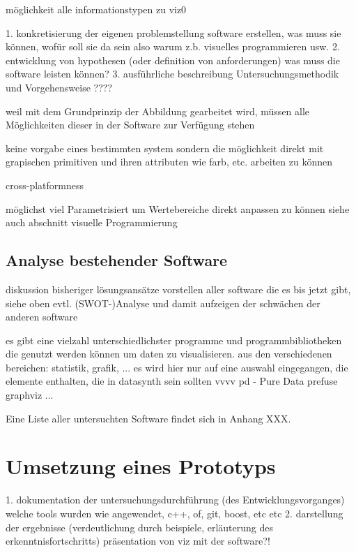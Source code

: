 \documentclass[a4paper, 12pt, DIVcalc, onepage, pdftex, headsepline, footsepline]{scrreprt}
\begin{document}
möglichkeit alle informationstypen zu viz0

1. konkretisierung der eigenen problemstellung
software erstellen, was muss sie können, wofür soll sie da sein
also warum z.b. visuelles programmieren usw.
2. entwicklung von hypothesen (oder definition von anforderungen)
was muss die software leisten können?
3. ausführliche beschreibung Untersuchungsmethodik und Vorgehensweise
????

weil mit dem Grundprinzip der Abbildung gearbeitet wird, müssen alle Möglichkeiten dieser in der Software zur Verfügung stehen

keine vorgabe eines bestimmten system sondern die möglichkeit direkt mit grapischen primitiven und ihren attributen wie farb, etc. arbeiten zu können

cross-platformness

möglichst viel Parametrisiert um Wertebereiche direkt anpassen zu können
siehe auch abschnitt visuelle Programmierung










\section{Analyse bestehender Software}
\label{sec:bestehendeSoftware}
diskussion bisheriger lösungsansätze
vorstellen aller software die es bis jetzt gibt, siehe oben
evtl. (SWOT-)Analyse und damit aufzeigen der schwächen der anderen software

es gibt eine vielzahl unterschiedlichster programme und programmbibliotheken die genutzt werden können um daten zu visualisieren.
aus den verschiedenen bereichen: statistik, grafik, ...
es wird hier nur auf eine auswahl eingegangen, die elemente enthalten, die in datasynth sein sollten
vvvv
pd - Pure Data
prefuse
graphviz
...

Eine Liste aller untersuchten Software findet sich in Anhang XXX.



\chapter{Umsetzung eines Prototyps}
\label{cha:Umsetzung}
1. dokumentation der untersuchungsdurchführung (des Entwicklungsvorganges)
welche tools wurden wie angewendet, c++, of, git, boost, etc etc
2. darstellung der ergebnisse (verdeutlichung durch beispiele, erläuterung des erkenntnisfortschritts)
präsentation von viz mit der software?!
\end{document}
